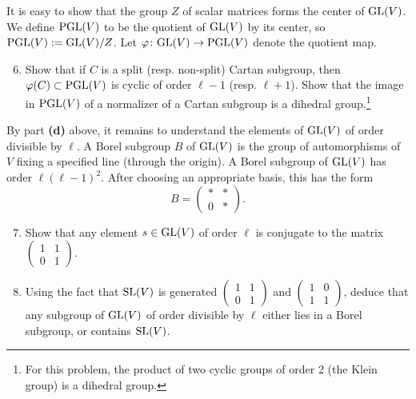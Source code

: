 \documentclass[11pt]{article}
\newcommand{\GL}{{\rm GL}}
\newcommand{\PGL}{{\rm PGL}}
\newcommand{\SL}{{\rm SL}}
\theoremstyle{definition}
\begin{document}
It is easy to show that the group $Z$ of scalar matrices forms the center of $\GL(V)$.
We define $\PGL(V)$ to be the quotient of $\GL(V)$ by its center, so $\PGL(V) := \GL(V)/Z$.
Let $\varphi \colon \GL(V) \to \PGL(V)$ denote the quotient map.

\begin{enumerate}[{\bf(a)}]
\setcounter{enumi}{5}
\item Show that if $C$ is a split (resp. non-split) Cartan subgroup, then $\varphi(C) \subset \PGL(V)$ is cyclic of order $\ell-1$ (resp. $\ell +1$).    Show that the image in $\PGL(V)$ of a normalizer of a Cartan subgroup is a dihedral group.\footnote{For this problem, the product of two cyclic groups of order 2 (the Klein group) is a dihedral group.}
\end{enumerate}

By part {\bf{(d)}} above, it remains to understand the elements of $\GL(V)$ of order divisible by $\ell$.
A Borel subgroup $B$ of $\GL(V)$ is the group of automorphisms of $V$ fixing a specified line (through the origin).
A Borel subgroup of $\GL(V)$ has order $\ell (\ell-1)^2$.  After choosing an appropriate basis, this has the form
\[
B = \begin{pmatrix} \ast & \ast \\ 0 & \ast \end{pmatrix}.
\]
 
\begin{enumerate}[{\bf(a)}]
\setcounter{enumi}{6}
 \item Show that any element $s \in \GL(V)$ of order $\ell$ is conjugate to the matrix $\left(\begin{smallmatrix} 1 & 1 \\ 0 & 1\end{smallmatrix}\right)$.
 
 \item Using the fact that $\SL(V)$ is generated $\left(\begin{smallmatrix} 1 & 1\\ 0& 1\end{smallmatrix}\right)$ and $\left(\begin{smallmatrix} 1 & 0\\ 1 & 1\end{smallmatrix}\right)$, deduce that any subgroup of $\GL(V)$ of order divisible by $\ell$  either lies in a Borel subgroup, or contains $\SL(V)$.
 
\end{enumerate}
\end{document}
